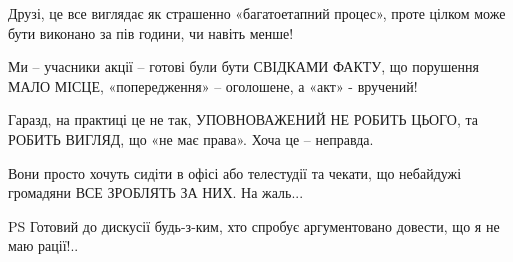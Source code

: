 Друзі, це все виглядає як страшенно «багатоетапний процес», проте цілком може
бути виконано за пів години, чи навіть менше!

Ми – учасники акції – готові були бути СВІДКАМИ ФАКТУ, що порушення МАЛО МІСЦЕ,
«попередження» – оголошене, а «акт» - вручений!

Гаразд, на практиці це не так, УПОВНОВАЖЕНИЙ НЕ РОБИТЬ ЦЬОГО, та РОБИТЬ ВИГЛЯД,
що «не має права». Хоча це – неправда. 

Вони просто хочуть сидіти в офісі або телестудії та чекати, що небайдужі
громадяни ВСЕ ЗРОБЛЯТЬ ЗА НИХ. На жаль...

PS Готовий до дискусії будь-з-ким, хто спробує аргументовано довести, що я не
маю рації!..

